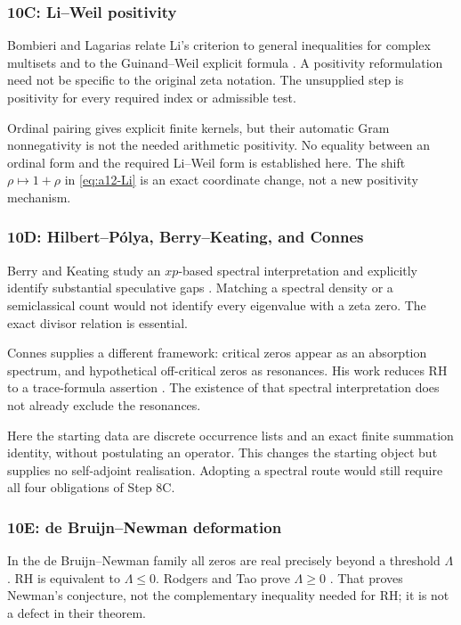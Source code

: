 \subsubsection{10C: Li--Weil positivity}
\label{subsubsec:a12-lit-Li}
Bombieri and Lagarias relate Li's criterion to general inequalities for
complex multisets and to the Guinand--Weil explicit formula
\cite{BombieriLagarias1999}. A positivity reformulation need not be
specific to the original zeta notation. The unsupplied step is positivity
for every required index or admissible test.

Ordinal pairing gives explicit finite kernels, but their automatic Gram
nonnegativity is not the needed arithmetic positivity. No equality between
an ordinal form and the required Li--Weil form is established here.
The shift $\rho\mapsto1+\rho$ in \eqref{eq:a12-Li} is an exact coordinate
change, not a new positivity mechanism.

\subsubsection{10D: Hilbert--P\'olya, Berry--Keating, and Connes}
\label{subsubsec:a12-lit-spectral}
Berry and Keating study an $xp$-based spectral interpretation and
explicitly identify substantial speculative gaps \cite{BerryKeating1999}.
Matching a spectral density or a semiclassical count would not identify
every eigenvalue with a zeta zero. The exact divisor relation is essential.

Connes supplies a different framework: critical zeros appear as an
absorption spectrum, and hypothetical off-critical zeros as resonances.
His work reduces RH to a trace-formula assertion \cite{Connes1998}.
The existence of that spectral interpretation does not already exclude
the resonances.

Here the starting data are discrete occurrence lists and an exact finite
summation identity, without postulating an operator. This changes the
starting object but supplies no self-adjoint realisation. Adopting a
spectral route would still require all four obligations of Step 8C.

\subsubsection{10E: de Bruijn--Newman deformation}
\label{subsubsec:a12-lit-Newman}
In the de Bruijn--Newman family all zeros are real precisely beyond a
threshold $\Lambda$. RH is equivalent to $\Lambda\le0$.
Rodgers and Tao prove $\Lambda\ge0$ \cite{RodgersTao2018}.
That proves Newman's conjecture, not the complementary inequality needed
for RH; it is not a defect in their theorem.

